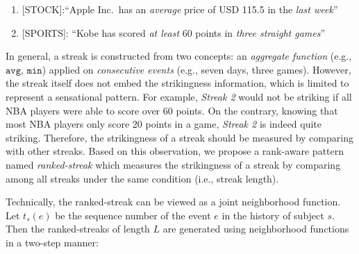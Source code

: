 
\begin{enumerate}
	\item{[STOCK]:``Apple Inc.~has an \emph{average} price of USD 115.5 in the \emph{last week}''}
	\item{[SPORTS]: ``Kobe has scored \emph{at least} 60 points in \emph{three straight games}'' }
\end{enumerate}
In general, a streak is constructed from two concepts: an \emph{aggregate function} (e.g., $\mathtt{avg}$, $\mathtt{min}$)
applied on \emph{consecutive events} (e.g., seven days, three games). 
However, the streak itself does not embed the strikingness information, which is limited
to represent a sensational pattern. 
%
%
%
For example, \emph{Streak 2} would not be striking if all NBA players were able to score over 60 points. 
On the contrary, knowing that most NBA players only score 20 points in a game,
\emph{Streak 2} is indeed quite striking. 
Therefore, the strikingness of a streak should be measured by comparing with other streaks.
Based on this observation, we propose a rank-aware pattern named \emph{ranked-streak} which measures the strikingness of
a streak by comparing among all streaks under the same condition (i.e., streak length).

Technically, the ranked-streak can be viewed as a joint neighborhood function. 
Let $t_s(e)$ be the sequence number of the event $e$ in the history of subject $s$.
Then the ranked-streaks of length $L$ are generated using neighborhood functions in a two-step manner: 

